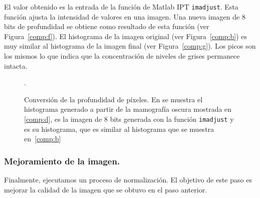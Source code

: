 El valor obtenido es la entrada de la función de Matlab IPT \texttt{imadjust}.
Esta función ajusta la intensidad de valores en una imagen. Una nueva imagen de
8 bits de profundidad se obtiene como resultado de esta función (ver
Figura~\ref{comp:f}). El histograma de la imagen original (ver
Figura~\ref{comp:b}) es muy similar al histograma de la imagen final (ver
Figura~\ref{comp:g}). Los picos son los mismos lo que indica que la
concentración de niveles de grises permanece intacta.

\begin{figure}[h]
  \begin{center}
    \hspace{12pt}
    \hspace{12pt}
  \end{center}

  \caption[Conversión de la profundidad de píxeles]
  {Conversión de la profundidad de píxeles. En \protect{} se
  muestra el histograma generado a partir de la mamografía oscura mostrada en
  \protect\ref{comp:d}, \protect{} es la imagen de 8 bits
  generada con la función \texttt{imadjust} y \protect{} es su
  histograma, que es similar al histograma que se muestra en~\ref{comp:b}}. 
  
  \label{img:shrinking-two}
\end{figure}

\subsubsection{Mejoramiento de la imagen.}

Finalmente, ejecutamos un proceso de normalización. El objetivo de este paso es
mejorar la calidad de la imagen que se obtuvo en el paso anterior.

%
